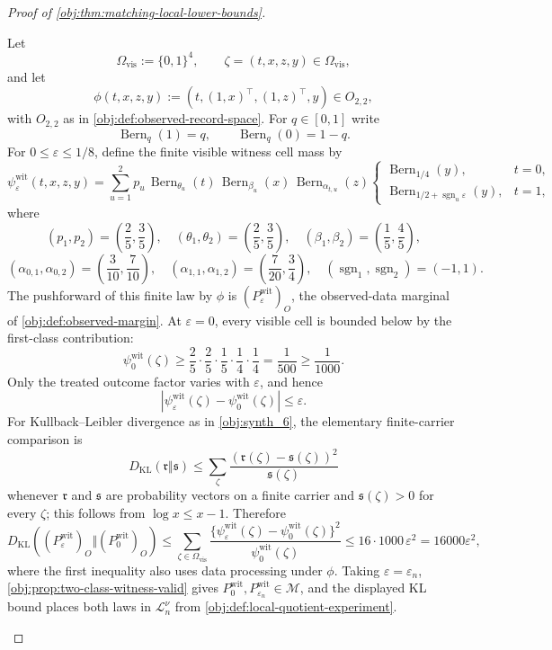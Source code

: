 \begin{proof}[Proof of \cref{obj:thm:matching-local-lower-bounds}]
\begin{enumerate}
Let
\[
\Omega_{\mathrm{vis}}:=\{0,1\}^4,
\qquad
\zeta=(t,x,z,y)\in\Omega_{\mathrm{vis}},
\]
and let
\[
\phi(t,x,z,y):=(t,(1,x)^\top,(1,z)^\top,y)\in O_{2,2},
\]
with \(O_{2,2}\) as in \cref{obj:def:observed-record-space}.  For \(q\in[0,1]\) write
\[
\operatorname{Bern}_q(1)=q,\qquad
\operatorname{Bern}_q(0)=1-q .
\]
For \(0\le\varepsilon\le1/8\), define the finite visible witness cell mass by
\[
\psi^{\mathrm{wit}}_{\varepsilon}(t,x,z,y)
=
\sum_{u=1}^{2}
p_u\,\operatorname{Bern}_{\theta_u}(t)\,
\operatorname{Bern}_{\beta_u}(x)\,
\operatorname{Bern}_{\alpha_{t,u}}(z)
\begin{cases}
\operatorname{Bern}_{1/4}(y),& t=0,\\
\operatorname{Bern}_{1/2+\operatorname{sgn}_u\varepsilon}(y),& t=1,
\end{cases}
\]
where
\[
(p_1,p_2)=\left(\frac25,\frac35\right),\quad
(\theta_1,\theta_2)=\left(\frac25,\frac35\right),\quad
(\beta_1,\beta_2)=\left(\frac15,\frac45\right),
\]
\[
(\alpha_{0,1},\alpha_{0,2})=\left(\frac3{10},\frac7{10}\right),\quad
(\alpha_{1,1},\alpha_{1,2})=\left(\frac7{20},\frac34\right),\quad
(\operatorname{sgn}_1,\operatorname{sgn}_2)=(-1,1).
\]
The pushforward of this finite law by \(\phi\) is \((P_{\varepsilon}^{\mathrm{wit}})_O\), the observed-data marginal of \cref{obj:def:observed-margin}.  At \(\varepsilon=0\), every visible cell is bounded below by the first-class contribution:
\[
\psi^{\mathrm{wit}}_{0}(\zeta)
\ge
\frac25\cdot\frac25\cdot\frac15\cdot\frac14\cdot\frac14
=
\frac1{500}
\ge
\frac1{1000}.
\]
Only the treated outcome factor varies with \(\varepsilon\), and hence
\[
\left|\psi^{\mathrm{wit}}_{\varepsilon}(\zeta)
-\psi^{\mathrm{wit}}_{0}(\zeta)\right|
\le \varepsilon .
\]
For Kullback--Leibler divergence as in \cref{obj:synth_6}, the elementary finite-carrier comparison is
\[
D_{\mathrm{KL}}(\mathfrak r\Vert\mathfrak s)
\le
\sum_{\zeta}\frac{(\mathfrak r(\zeta)-\mathfrak s(\zeta))^2}{\mathfrak s(\zeta)}
\]
whenever \(\mathfrak r\) and \(\mathfrak s\) are probability vectors on a finite carrier and
\(\mathfrak s(\zeta)>0\) for every \(\zeta\); this follows from \(\log x\le x-1\).  Therefore
\[
D_{\mathrm{KL}}\!\left((P_{\varepsilon}^{\mathrm{wit}})_O\Vert(P_0^{\mathrm{wit}})_O\right)
\le
\sum_{\zeta\in\Omega_{\mathrm{vis}}}
\frac{\{\psi^{\mathrm{wit}}_{\varepsilon}(\zeta)-\psi^{\mathrm{wit}}_{0}(\zeta)\}^2}
{\psi^{\mathrm{wit}}_{0}(\zeta)}
\le
16\cdot1000\,\varepsilon^2
=
16000\varepsilon^2,
\]
where the first inequality also uses data processing under \(\phi\).  Taking
\(\varepsilon=\varepsilon_n\), \cref{obj:prop:two-class-witness-valid} gives
\(P_0^{\mathrm{wit}},P_{\varepsilon_n}^{\mathrm{wit}}\in\mathcal M\), and the displayed KL bound places both laws in \(\mathcal L_n^\nu\) from \cref{obj:def:local-quotient-experiment}. %


\end{enumerate}
\end{proof}
